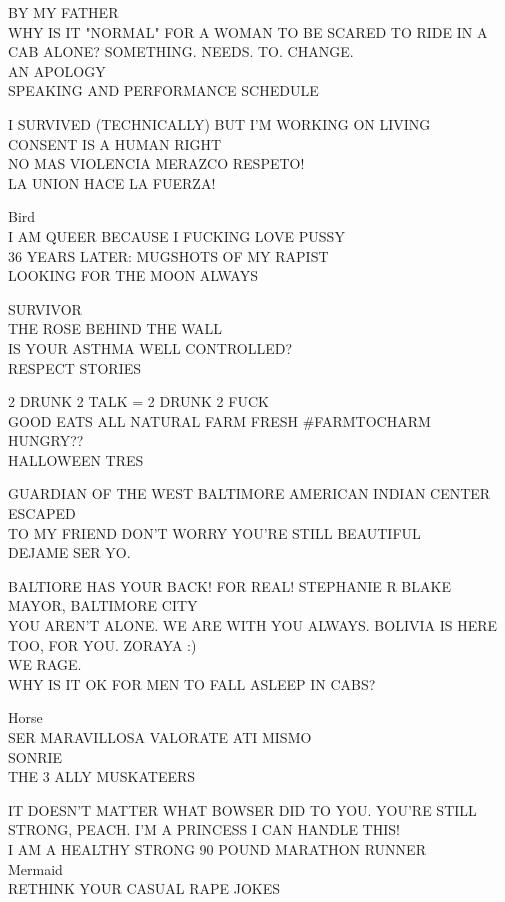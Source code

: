 \documentclass[10pt,letterpaper]{article}
\begin{document}
BY MY FATHER\\
WHY IS IT "NORMAL" FOR A WOMAN TO BE SCARED TO RIDE IN A CAB ALONE?  SOMETHING.  NEEDS.  TO.  CHANGE.\\
AN APOLOGY\\
SPEAKING AND PERFORMANCE SCHEDULE

I SURVIVED (TECHNICALLY) BUT I'M WORKING ON LIVING\\
CONSENT IS A HUMAN RIGHT\\
NO MAS VIOLENCIA MERAZCO RESPETO!\\
LA UNION HACE LA FUERZA!

Bird\\
I AM QUEER BECAUSE I FUCKING LOVE PUSSY\\
36 YEARS LATER: MUGSHOTS OF MY RAPIST\\
LOOKING FOR THE MOON ALWAYS

SURVIVOR\\
THE ROSE BEHIND THE WALL\\
IS YOUR ASTHMA WELL CONTROLLED?\\
RESPECT STORIES

2 DRUNK 2 TALK = 2 DRUNK 2 FUCK\\
GOOD EATS ALL NATURAL FARM FRESH \#FARMTOCHARM\\
HUNGRY??\\
HALLOWEEN TRES

GUARDIAN OF THE WEST BALTIMORE AMERICAN INDIAN CENTER\\
ESCAPED\\
TO MY FRIEND DON'T WORRY YOU'RE STILL BEAUTIFUL\\
DEJAME SER YO.

BALTIORE HAS YOUR BACK!  FOR REAL!  STEPHANIE R BLAKE MAYOR, BALTIMORE CITY\\
YOU AREN'T ALONE.  WE ARE WITH YOU ALWAYS.  BOLIVIA IS HERE TOO, FOR YOU.  ZORAYA :)\\
WE RAGE.\\
WHY IS IT OK FOR MEN TO FALL ASLEEP IN CABS?

Horse\\
SER MARAVILLOSA VALORATE ATI MISMO\\
SONRIE\\
THE 3 ALLY MUSKATEERS

IT DOESN'T MATTER WHAT BOWSER DID TO YOU.  YOU'RE STILL STRONG, PEACH.  I'M A PRINCESS I CAN HANDLE THIS!\\
I AM A HEALTHY STRONG 90 POUND MARATHON RUNNER\\
Mermaid\\
RETHINK YOUR CASUAL RAPE JOKES
\end{document}
